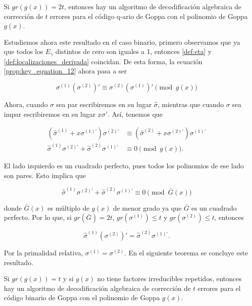 \begin{theorem}
    Si $gr(g(x)) = 2t$, entonces hay un algoritmo de decodificación algebraica de corrección de $t$ errores para el código q-ario de Goppa con el polinomio de Goppa $g(x)$.
\end{theorem}

Estudiemos ahora este resultado en el caso binario, primero observamos que ya que todos los $E_\gamma$ distintos de cero son iguales a 1, entonces \ref{def:eta} y \ref{def:localizaciones_derivada} coincidan. De esta forma, la ecuación \ref{prop:key_equation_12} ahora pasa a ser

$$\sigma^{(1)} \left( \sigma^{(2)} \right) ' \equiv \sigma^{(2)} \left( \sigma^{(1)} \right) ' \pmod{g(x)}$$

Ahora, cuando $\sigma$ sea par escribiremos en su lugar $\hat{\sigma}$, mientras que cuando $\sigma$ sea impar escribiremos en su lugar $x \sigma '$. Así, tenemos que

\begin{align*} 
    \left( \hat{\sigma}^{(1)} + x \sigma^{(1)'} \right) \sigma^{(2)'} &\equiv \left( \hat{\sigma}^{(2)} + x \sigma^{(2)'} \right) \sigma^{(1)'}\\ 
    \hat{\sigma}^{(1)} \sigma^{(2)'} + \hat{\sigma}^{(2)} \sigma^{(1)'} &\equiv 0 \pmod{g(x)}.
\end{align*}

El lado izquierdo es un cuadrado perfecto, pues todos los polinomios de ese lado son pares. Esto implica que

$$\hat{\sigma}^{(1)} \sigma^{(2)'} + \hat{\sigma}^{(2)} \sigma^{(1)'} \equiv 0 \pmod{\bar{G}(x)}$$

donde $\bar{G}(x)$ es múltiplo de $g(x)$ de menor grado ya que $\bar{G}$ es un cuadrado perfecto. Por lo que, si $gr(\bar{G}) = 2t$, $gr(\sigma^{(1)}) \leq t$ y $gr(\sigma^{(2)}) \leq t$, entonces 

$$\hat{\sigma}^{(1)} \left( \sigma^{(2)} \right) ' = \hat{\sigma}^{(2)} \sigma^{(1)'}.$$

Por la primalidad relativa, $\sigma^{(1)} = \sigma^{(2)}$. En el siguiente teorema se concluye este resultado.

\begin{theorem}
    Si $gr(g(x)) = t$ y si $g(x)$ no tiene factores irreducibles repetidos, entonces hay un algoritmo de decodificación algebraica de corrección de $t$ errores para el código binario de Goppa con el polinomio de Goppa $g(x)$.
\end{theorem}

